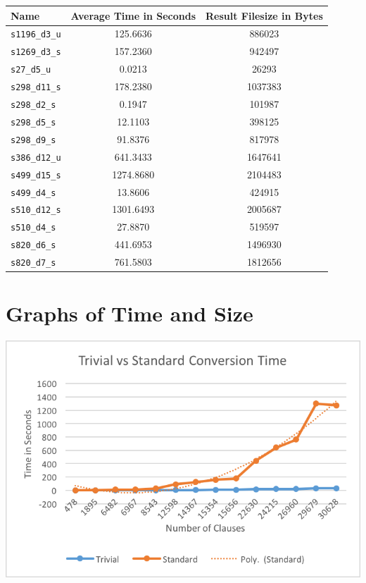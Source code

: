 \begin{center}
\begin{tabular}{| l | S[table-format=3.2] | S[table-format=3.2] |}
\hline
\textbf{Name} & \textbf{Average Time in Seconds} & \textbf{Result Filesize in Bytes} \\ \hline
\texttt{s1196\_d3\_u} & 125.6636 & 886023 \\
\texttt{s1269\_d3\_s} & 157.2360 & 942497 \\
\texttt{s27\_d5\_u} & 0.0213 & 26293 \\
\texttt{s298\_d11\_s} & 178.2380 & 1037383 \\
\texttt{s298\_d2\_s} & 0.1947 & 101987 \\
\texttt{s298\_d5\_s} & 12.1103 & 398125 \\
\texttt{s298\_d9\_s} & 91.8376 & 817978 \\
\texttt{s386\_d12\_u} & 641.3433 & 1647641 \\
\texttt{s499\_d15\_s} & 1274.8680 & 2104483 \\
\texttt{s499\_d4\_s} & 13.8606 & 424915 \\
\texttt{s510\_d12\_s} & 1301.6493 & 2005687 \\
\texttt{s510\_d4\_s} & 27.8870 & 519597 \\
\texttt{s820\_d6\_s} & 441.6953 & 1496930 \\
\texttt{s820\_d7\_s} & 761.5803 & 1812656 \\
\hline
\end{tabular}
\end{center}

\section{Graphs of Time and Size}

\begin{center}
\includegraphics{png/trivialvsstandardconversiontime.png}
\end{center}

